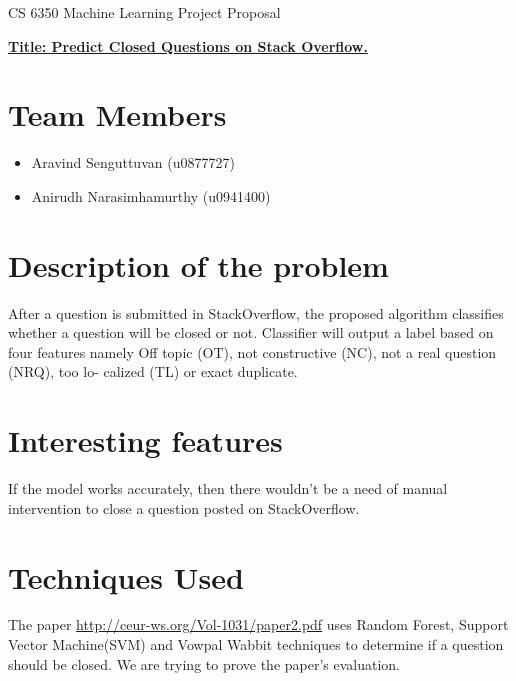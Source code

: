 \documentclass[11pt]{exam}
\begin{document}
\begingroup
\fontsize{14pt}{16pt}\selectfont
\begin{center}  
CS 6350 Machine Learning Project Proposal \\

\end{center}  
\endgroup
\begin{center}
\textbf{\underline{Title: Predict Closed Questions on Stack Overflow.}
}
\end{center}
%
%



\section{Team Members}

\begin{itemize}
	\item Aravind Senguttuvan (u0877727)
	\item Anirudh Narasimhamurthy (u0941400)
\end{itemize}


\section{Description of the problem}

After a question is submitted in StackOverflow, the proposed algorithm classifies whether a question will be closed or not. Classifier will output a label based on four features namely  Off topic (OT), not constructive (NC), not a real question (NRQ), too lo-
calized (TL) or exact duplicate.  

\section{Interesting features}

If the model works accurately, then there wouldn't be a need of manual intervention to close a question posted on StackOverflow. 

\section{Techniques Used}

The paper \url{http://ceur-ws.org/Vol-1031/paper2.pdf} uses Random Forest, Support Vector Machine(SVM) and Vowpal Wabbit techniques to determine if a question should be closed. We are trying to prove the paper's evaluation.
\end{document}
